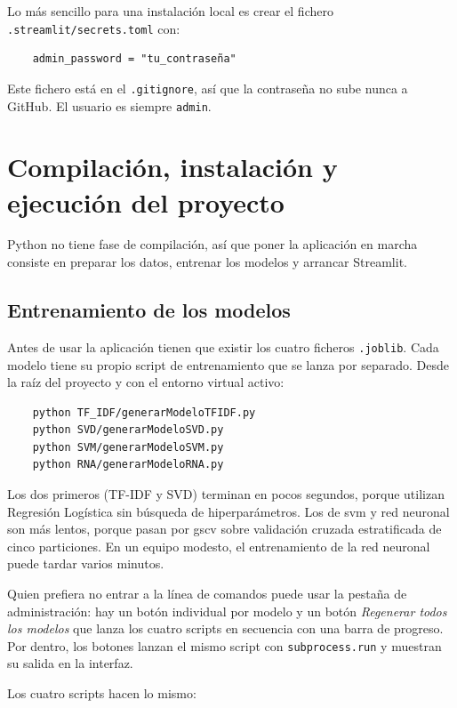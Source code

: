 Lo más sencillo para una instalación local es crear el fichero \texttt{.streamlit/secrets.toml} con:

\begin{verbatim}
	admin_password = "tu_contraseña"
\end{verbatim}

Este fichero está en el \texttt{.gitignore}, así que la contraseña no sube nunca a GitHub. El usuario es siempre \texttt{admin}.

\section{Compilación, instalación y ejecución del proyecto}

Python no tiene fase de compilación, así que poner la aplicación en marcha consiste en preparar los datos, entrenar los modelos y arrancar Streamlit.

\subsection{Entrenamiento de los modelos}

Antes de usar la aplicación tienen que existir los cuatro ficheros \texttt{.joblib}. Cada modelo tiene su propio script de entrenamiento que se lanza por separado. Desde la raíz del proyecto y con el entorno virtual activo:

\begin{verbatim}
	python TF_IDF/generarModeloTFIDF.py
	python SVD/generarModeloSVD.py
	python SVM/generarModeloSVM.py
	python RNA/generarModeloRNA.py
\end{verbatim}

Los dos primeros (TF-IDF y SVD) terminan en pocos segundos, porque utilizan Regresión Logística sin búsqueda de hiperparámetros. Los de \gls{svm} y red neuronal son más lentos, porque pasan por \gls{gscv} sobre validación cruzada estratificada de cinco particiones. En un equipo modesto, el entrenamiento de la red neuronal puede tardar varios minutos.

Quien prefiera no entrar a la línea de comandos puede usar la pestaña de administración: hay un botón individual por modelo y un botón \textit{Regenerar todos los modelos} que lanza los cuatro scripts en secuencia con una barra de progreso. Por dentro, los botones lanzan el mismo script con \texttt{subprocess.run} y muestran su salida en la interfaz.

Los cuatro scripts hacen lo mismo:


